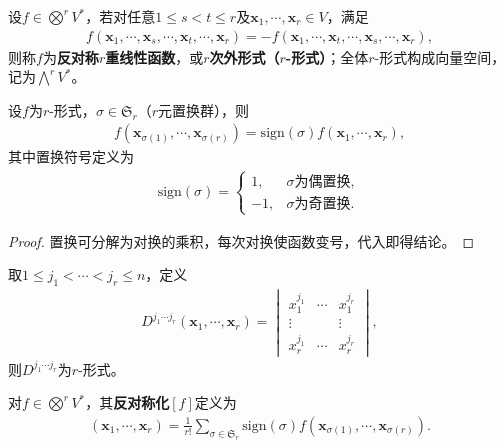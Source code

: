 \documentclass[../../main.tex]{subfiles}%
\begin{document}
\begin{definition}
设$f\in\bigotimes^r V^*$，若对任意$1\leqslant s<t\leqslant r$及$\boldsymbol{x}_1,\cdots,\boldsymbol{x}_r\in V$，满足
\begin{align*}
f(\boldsymbol{x}_1,\cdots,\boldsymbol{x}_s,\cdots,\boldsymbol{x}_t,\cdots,\boldsymbol{x}_r)=-f(\boldsymbol{x}_1,\cdots,\boldsymbol{x}_t,\cdots,\boldsymbol{x}_s,\cdots,\boldsymbol{x}_r),
\end{align*}
则称$f$为\textbf{反对称$r$重线性函数}，或\textbf{$r$次外形式（$r$-形式）}；全体$r$-形式构成向量空间，记为$\bigwedge^r V^*$。
\end{definition}

\begin{proposition}
设$f$为$r$-形式，$\sigma\in\mathfrak{S}_r$（$r$元置换群），则
\begin{align}
f(\boldsymbol{x}_{\sigma(1)},\cdots,\boldsymbol{x}_{\sigma(r)})=\mathrm{sign}(\sigma)f(\boldsymbol{x}_1,\cdots,\boldsymbol{x}_r),
\label{eq:alternate_permutation}
\end{align}
其中置换符号定义为
\begin{align}
\mathrm{sign}(\sigma)=
\begin{cases}
1, & \sigma\text{为偶置换},\\
-1, & \sigma\text{为奇置换}.
\end{cases}
\label{eq:perm_sign}
\end{align}
\end{proposition}
\begin{proof}
置换可分解为对换的乘积，每次对换使函数变号，代入即得结论。
\end{proof}

\begin{definition}
取$1\leqslant j_1<\cdots<j_r\leqslant n$，定义
\begin{align}
D^{j_1\cdots j_r}(\boldsymbol{x}_1,\cdots,\boldsymbol{x}_r)=
\begin{vmatrix}
x_1^{j_1} & \cdots & x_1^{j_r}\\
\vdots & & \vdots\\
x_r^{j_1} & \cdots & x_r^{j_r}
\end{vmatrix},
\label{eq:det_form}
\end{align}
则$D^{j_1\cdots j_r}$为$r$-形式。
\end{definition}

\begin{definition}
对$f\in\bigotimes^r V^*$，其\textbf{反对称化}$[f]$定义为
\begin{align}
[f](\boldsymbol{x}_1,\cdots,\boldsymbol{x}_r)=\frac{1}{r!}\sum\limits_{\sigma\in\mathfrak{S}_r}\mathrm{sign}(\sigma)f(\boldsymbol{x}_{\sigma(1)},\cdots,\boldsymbol{x}_{\sigma(r)}).
\label{eq:antisymmetrization}
\end{align}
\end{definition}
\end{document}
